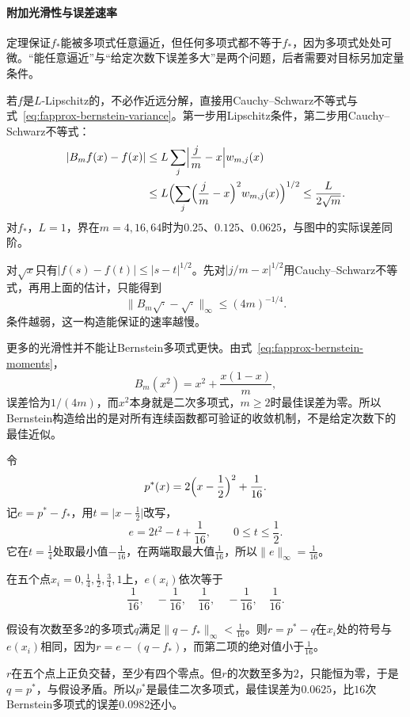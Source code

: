 \paragraph{附加光滑性与误差速率}
定理保证$f_*$能被多项式任意逼近，但任何多项式都不等于$f_*$，因为多项式处处可微。“能任意逼近”与“给定次数下误差多大”是两个问题，后者需要对目标另加定量条件。

若$f$是$L$-Lipschitz的，不必作近远分解，直接用Cauchy--Schwarz不等式与式~\eqref{eq:fapprox-bernstein-variance}。第一步用Lipschitz条件，第二步用Cauchy--Schwarz不等式：
\[
 \begin{aligned}
 \lvert B_mf(x)-f(x)\rvert
 &\leq L\sum_j\Bigl\lvert\frac jm-x\Bigr\rvert w_{m,j}(x)\\
 &\leq L\Bigl(\sum_j\Bigl(\frac jm-x\Bigr)^2w_{m,j}(x)\Bigr)^{1/2}\leq\frac L{2\sqrt m}.
 \end{aligned}
\]
对$f_*$，$L=1$，界在$m=4,16,64$时为$0.25$、$0.125$、$0.0625$，与图中的实际误差同阶。

对$\sqrt x$只有$\lvert f(s)-f(t)\rvert\leq\lvert s-t\rvert^{1/2}$。先对$\lvert j/m-x\rvert^{1/2}$用Cauchy--Schwarz不等式，再用上面的估计，只能得到
\[
 \lVert B_m\sqrt{\cdot}-\sqrt{\cdot}\rVert_\infty\leq(4m)^{-1/4}.
\]
条件越弱，这一构造能保证的速率越慢。

更多的光滑性并不能让Bernstein多项式更快。由式~\eqref{eq:fapprox-bernstein-moments}，
\[
 B_m(x^2)=x^2+\frac{x(1-x)}m ,
\]
误差恰为$1/(4m)$，而$x^2$本身就是二次多项式，$m\geq2$时最佳误差为零。所以Bernstein构造给出的是对所有连续函数都可验证的收敛机制，不是给定次数下的最佳近似。

\begin{example}[折线的最佳二次多项式]
令
\[
 p^*(x)=2\Bigl(x-\frac12\Bigr)^2+\frac1{16}.
\]
记$e=p^*-f_*$，用$t=\lvert x-\frac12\rvert$改写，
\[
 e=2t^2-t+\frac1{16},\qquad 0\leq t\leq\frac12 .
\]
它在$t=\frac14$处取最小值$-\frac1{16}$，在两端取最大值$\frac1{16}$，所以$\lVert e\rVert_\infty=\frac1{16}$。

在五个点$x_i=0,\frac14,\frac12,\frac34,1$上，$e(x_i)$依次等于
\[
 \frac1{16},\quad-\frac1{16},\quad\frac1{16},\quad-\frac1{16},\quad\frac1{16}.
\]

假设有次数至多$2$的多项式$q$满足$\lVert q-f_*\rVert_\infty<\frac1{16}$。则$r=p^*-q$在$x_i$处的符号与$e(x_i)$相同，因为$r=e-(q-f_*)$，而第二项的绝对值小于$\frac1{16}$。

$r$在五个点上正负交替，至少有四个零点。但$r$的次数至多为$2$，只能恒为零，于是$q=p^*$，与假设矛盾。所以$p^*$是最佳二次多项式，最佳误差为$0.0625$，比$16$次Bernstein多项式的误差$0.0982$还小。
\end{example}

